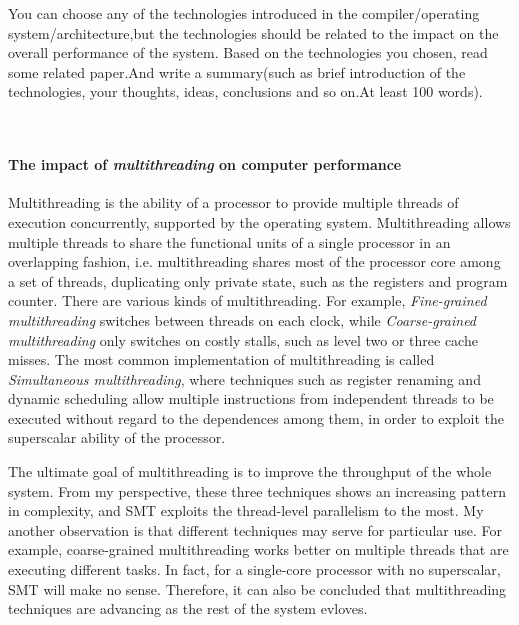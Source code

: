 \begin{exercise}[]{You can choose any of the technologies introduced in the compiler/operating system/architecture,but the technologies should be related to the impact on the overall performance of the system. Based on the technologies you chosen, read some related paper.And write a summary(such as brief introduction of the technologies, your thoughts, ideas, conclusions and so on.At least 100 words). }
  \begin{solution}
    \par{~}
  \paragraph{The impact of \textit{multithreading} on computer performance} Multithreading is the ability of a processor to provide multiple threads of execution concurrently, supported by the operating system. Multithreading allows multiple threads to share the functional units of a single processor in an overlapping fashion, i.e. multithreading shares most of the processor core among a set of threads, duplicating only private state, such as the registers and program counter. There are various kinds of multithreading. For example, \textit{Fine-grained multithreading} switches between threads on each clock, while \textit{Coarse-grained multithreading} only switches on costly stalls, such as level two or three cache misses. The most common implementation of multithreading is called \textit{Simultaneous multithreading}, where techniques such as register renaming and dynamic scheduling allow multiple instructions from independent threads to be executed without regard to the dependences among them, in order to exploit the superscalar ability of the processor.

  The ultimate goal of multithreading is to improve the throughput of the whole system. From my perspective, these three techniques shows an increasing pattern in complexity, and SMT exploits the thread-level parallelism to the most. My another observation is that different techniques may serve for particular use. For example, coarse-grained multithreading works better on multiple threads that are executing different tasks. In fact, for a single-core processor with no superscalar, SMT will make no sense. Therefore, it can also be concluded that multithreading techniques are advancing as the rest of the system evloves.
  \end{solution}
  \label{ex4}
\end{exercise}